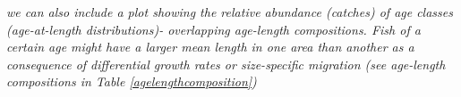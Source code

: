 \documentclass[a4paper 12pt]{article}
\numberwithin{equation}{section}
\begin{document}


\emph{we can also include a plot showing the relative abundance (catches) of age classes (age-at-length distributions)- overlapping age-length compositions. Fish of a certain age might have a larger mean length in one area than another as a consequence of differential growth rates or size-specific migration (see age-length compositions in Table \ref{agelengthcomposition})} 
\end{document}
